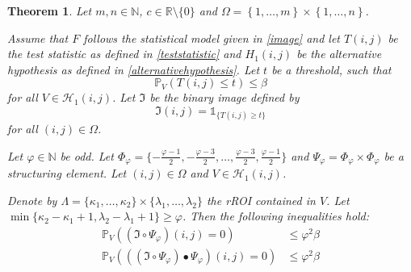 \documentclass[a4paper,12pt]{article}
\theoremstyle{plain}
\newtheorem{theorem}{Theorem}[section]
\theoremstyle{definition}
\begin{document}
\begin{theorem}
	Let $m, n \in \mathbb{N}$, $c \in \mathbb{R} \setminus \{ 0 \}$ and $\Omega = \left\{ 1, \dots, m \right\} \times \left\{ 1, \dots, n \right\}$.
	
	Assume that $F$ follows the statistical model given in \eqref{image} and let $T(i, j)$ be the test statistic as defined in \eqref{teststatistic} and $H_1(i, j)$ be the alternative hypothesis as defined in \eqref{alternativehypothesis}. Let $t$ be a threshold, such that
	\begin{equation*}
		\mathbb{P}_V\left( T(i, j) \leq t \right) \leq \beta
	\end{equation*}
	for all $V \in \mathcal{H}_1(i, j)$. Let $\mathfrak{I}$ be the binary image defined by
	\begin{equation}
		\mathfrak{I}(i, j) = \mathds{1}_{ \{ T(i, j) \geq t \} }
	\end{equation}
	for all $(i, j) \in \Omega$.
	
	Let $\varphi \in \mathbb{N}$ be odd. Let $\Phi_\varphi = \{ -\frac{\varphi - 1}{2}, -\frac{\varphi - 3}{2}, \dots, \frac{\varphi - 3}{2}, \frac{\varphi - 1}{2} \}$ and $\Psi_\varphi = \Phi_\varphi \times \Phi_\varphi$ be a structuring element. Let $(i, j) \in \Omega$ and $V \in \mathcal{H}_1(i, j)$.
	
	Denote by $\varLambda = \{ \kappa_1, \dots, \kappa_2 \} \times \{ \lambda_1, \dots, \lambda_2 \}$ the rROI contained in $V$. Let $\min \{ \kappa_2 - \kappa_1 + 1, \lambda_2 - \lambda_1 + 1 \} \geq \varphi$.
	Then the following inequalities hold:
	\begin{align}
		\mathbb{P}_V( (\mathfrak{I} \circ \Psi_\varphi)(i, j) = 0 ) &\leq \varphi^2 \beta \label{ineqtypeIIopening} \\
		\mathbb{P}_V( ((\mathfrak{I} \circ \Psi_\varphi) \bullet \Psi_\varphi)(i, j) = 0 ) &\leq \varphi^2 \beta \label{ineqtypeIIclosing}
	\end{align}
\end{theorem}
\end{document}
